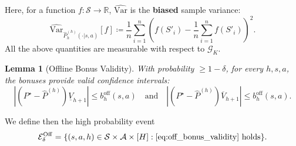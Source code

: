 \documentclass[twoside]{article}
\newtheorem{lemma}{Lemma}
\newcommand{\off}{\mathrm{off}} %
\newcommand{\boff}{b_h^{\off}} %
\newcommand{\ohighv}{\overline{V}} %
\newcommand{\olowv}{\underline{V}} %
\begin{document}
Here, for a function $f : \mathcal{S} \rightarrow \mathbb{R}$, $\widehat{\mathrm{Var}}$ is the \textbf{biased} sample variance:
\[
\widehat{\mathrm{Var}}_{\widehat{P}^{(h)}_h(\cdot|s,a)}[f] \coloneqq \frac{1}{n}\sum_{i=1}^n \left(f(S'_i) - \frac{1}{n}\sum_{i=1}^n f(S'_i)\right)^2.
\]
All the above quantities are measurable with respect to $\mathcal{G}_K$.
\begin{lemma}[Offline Bonus Validity] 
\label{lem:off_bonus_validity} 
With probability $\ge 1 - \delta$, for every $h, s, a$, the bonuses provide valid confidence intervals: 
\begin{equation}\label{eq:off_bonus_validity} 
|(P^{\star}-\widehat{P}^{(h)})\olowv_{h+1} |\le \boff(s,a) \quad\text{and}\quad |(P^{\star}-\widehat{P}^{(h)})\ohighv_{h+1}| \le \boff(s,a). 
\end{equation} 
\end{lemma}
%
We define then the high probability event 
%
\begin{equation}\label{eq:def_Eoff}
\mathcal{E}^{\mathrm{Off}}_\delta=\{(s,a,h) \in \mathcal{S} \times \mathcal{A} \times [H]:\eqref{eq:off_bonus_validity} \text{ holds}\}.
\end{equation}
%
\end{document}
